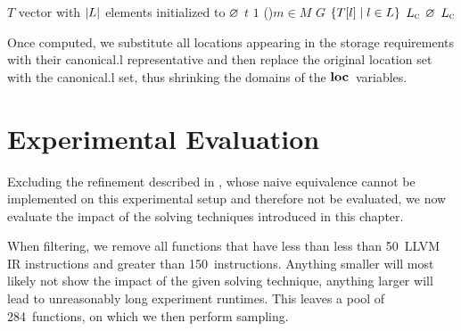 \begin{algorithm}[t]
  {%
    $T$ \Assign vector with $\mCard{L}$ elements initialized to $\varnothing$\;
    $t$ \Assign $1$\;
    \For(){$m \in M$}{%
    }
    $G$ \Assign $\mSetBuilder{T[l]}{l \in L}$
    $L_{\textrm{\textsc{c}}}$ \Assign $\varnothing$\;
    \Return $L_{\textrm{\textsc{c}}}$\;
  }

  \caption[Algorithm for computing the set of canonical locations]%
          {%
            Computes the canonical locations from a given location set.
            If location restrictions for some data are already enforced by
            the function, then these are also tagged and processed accordingly%
          }
\end{algorithm}

Once computed, we substitute all locations appearing in the storage requirements
with their \gls{canonical.l} representative and then replace the original
\gls{location set} with the \gls{canonical.l} set, thus shrinking the
\glspl{domain} of the $\mVar{loc}$~\glspl{variable}.


\section{Experimental Evaluation}

Excluding the refinement described in
, whose naive equivalence
cannot be implemented on this experimental setup and therefore not be evaluated,
we now evaluate the impact of the solving techniques introduced in this chapter.

When filtering, we remove all \glspl{function} that have less than less than
\num{50}~\gls{LLVM} \gls{IR} \glspl{instruction} and greater than
\num{150}~\glspl{instruction}.
%
Anything smaller will most likely not show the impact of the given solving
technique, anything larger will lead to unreasonably long experiment runtimes.
%
This leaves a pool of \num{284}~\glspl{function}, on which we then perform
sampling.

